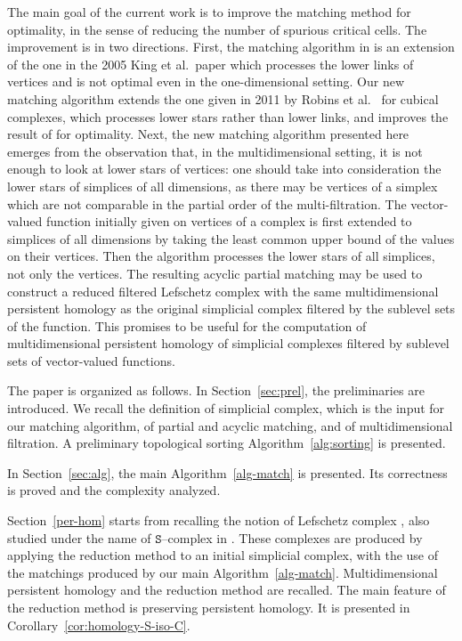 \documentclass[12pt]{article}
\newcommand{\sS}{\texttt{S}} \newcommand{\sA}{\texttt{A}}
\begin{document}
The main goal of the current work is to improve the matching method for optimality, in the sense of reducing the number of spurious critical cells. The improvement is in two directions. First, the matching algorithm in \cite{AlKaLa17} is an extension of the one in the 2005 King et al.\ paper \cite{KinKnuMra05} which processes the lower links of vertices and is not optimal even in the one-dimensional setting. Our new matching algorithm extends the one given in 2011 by Robins et al.\ \cite{RobWooShe11} for cubical complexes, which processes lower stars rather than lower links, and improves the result of \cite{KinKnuMra05} for optimality. Next, the new matching algorithm presented here emerges from the observation that, in the multidimensional setting, it is not enough to look at lower stars of vertices: one should take into consideration the lower stars of simplices of all dimensions, as there may be vertices of a simplex which are not comparable in the partial order of the multi-filtration. The vector-valued function initially given on vertices of a complex is first extended to simplices of all dimensions by taking the least common upper bound of the values on their vertices. Then the algorithm processes the lower stars of all simplices, not only the vertices. The resulting acyclic partial matching may be used to construct a reduced filtered Lefschetz complex with the same multidimensional persistent homology as the original simplicial complex filtered by the sublevel sets of the function. This promises to be useful for the computation of multidimensional persistent homology of  simplicial complexes filtered by  sublevel sets of vector-valued functions.

The paper is organized as follows. In Section~\ref{sec:prel}, the preliminaries are introduced. We recall the definition of simplicial complex, which is the input for our matching algorithm, of partial and acyclic matching, and of multidimensional filtration. A preliminary topological sorting Algorithm~\ref{alg:sorting} is presented.

In Section~\ref{sec:alg}, the main Algorithm~\ref{alg-match} is presented. Its correctness is proved and the complexity analyzed.

Section~\ref{per-hom} starts from recalling the notion of Lefschetz complex \cite{Lef42}, also studied under the name of $\sS$--complex in \cite{MrBa09}. These complexes are produced by applying the reduction method \cite{KaMrSl98,MrBa09,MiNa} to an initial simplicial complex, with the use of the matchings produced by our main Algorithm~\ref{alg-match}. Multidimensional persistent homology and the reduction method are recalled. The main feature of the reduction method is preserving persistent homology. It is presented in Corollary~\ref{cor:homology-S-iso-C}.
\end{document}
